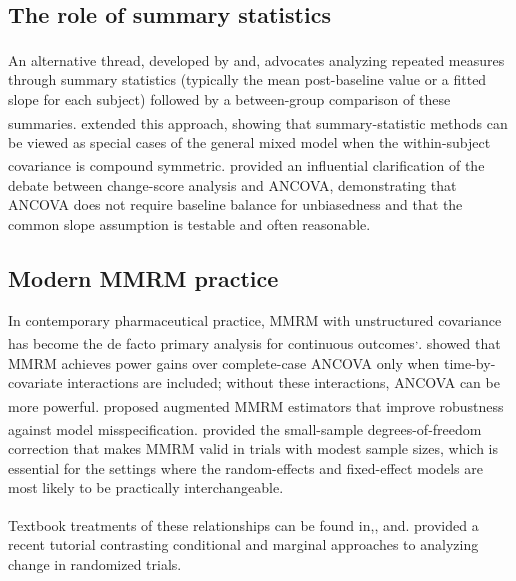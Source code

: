 \documentclass[
  11pt,
]{article}
\begin{document}
\subsection{The role of summary statistics}\label{the-role-of-summary-statistics}

An alternative thread, developed by\textsuperscript{} and\textsuperscript{},
advocates analyzing repeated measures through summary
statistics (typically the mean post-baseline value or
a fitted slope for each subject) followed by a
between-group comparison of these summaries.\textsuperscript{} extended this approach, showing that
summary-statistic methods can be viewed as special
cases of the general mixed model when the
within-subject covariance is compound symmetric.\textsuperscript{} provided an influential clarification
of the debate between change-score analysis and
ANCOVA, demonstrating that ANCOVA does not require
baseline balance for unbiasedness and that the common
slope assumption is testable and often reasonable.

\subsection{Modern MMRM practice}\label{modern-mmrm-practice}

In contemporary pharmaceutical practice, MMRM with
unstructured covariance has become the de facto
primary analysis for continuous outcomes\textsuperscript{,}.\textsuperscript{}
showed that MMRM achieves power gains over
complete-case ANCOVA only when time-by-covariate
interactions are included; without these interactions,
ANCOVA can be more powerful.\textsuperscript{}
proposed augmented MMRM estimators that improve
robustness against model misspecification.\textsuperscript{} provided the small-sample
degrees-of-freedom correction that makes MMRM valid
in trials with modest sample sizes, which is essential
for the settings where the random-effects and
fixed-effect models are most likely to be practically
interchangeable.

Textbook treatments of these relationships can be
found in\textsuperscript{},\textsuperscript{}, and\textsuperscript{}.\textsuperscript{} provided a recent tutorial
contrasting conditional and marginal approaches to
analyzing change in randomized trials.
\end{document}
